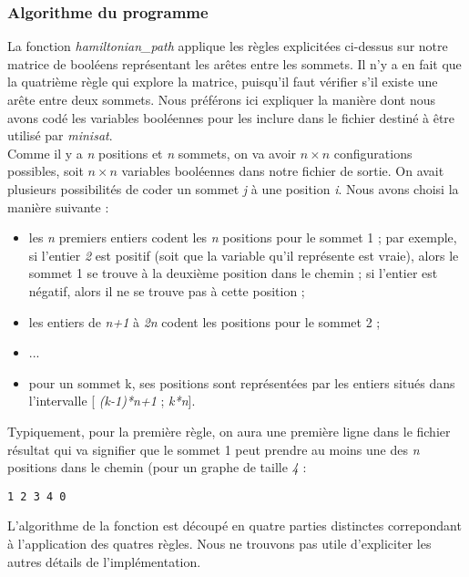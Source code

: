 \documentclass{article}
\begin{document}
\subsubsection{Algorithme du programme}

La fonction \textit{hamiltonian\_path} applique les r\`egles explicit\'ees ci-dessus sur notre matrice de bool\'eens
repr\'esentant les ar\^etes entre les sommets. Il n'y a en fait que la quatri\`eme r\`egle qui explore la matrice,
puisqu'il faut v\'erifier s'il existe une ar\^ete entre deux sommets. Nous pr\'ef\'erons ici expliquer la mani\`ere
dont nous avons cod\'e les variables bool\'eennes pour les inclure dans le fichier destin\'e \`a \^etre utilis\'e
par \textit{minisat}.\\

Comme il y a \textit{n} positions et \textit{n} sommets, on va avoir \textit{$n \times n$} configurations possibles, soit
\textit{$n \times n$} variables bool\'eennes dans notre fichier de sortie. On avait plusieurs possibilit\'es de coder
un sommet \textit{j} \`a une position \textit{i}. Nous avons choisi la mani\`ere suivante :
\begin{itemize}
 \item  les \textit{n} premiers entiers codent les \textit{n} positions pour le sommet 1 ; par exemple, si l'entier \textit{2}
est positif (soit que la variable qu'il repr\'esente est vraie), alors le sommet 1 se trouve \`a la deuxi\`eme position dans
le chemin ; si l'entier est n\'egatif, alors il ne se trouve pas \`a cette position ;
 \item  les entiers de \textit{n+1} \`a \textit{2n} codent les positions pour le sommet 2 ;
 \item ...
 \item pour un sommet k, ses positions sont repr\'esent\'ees par les entiers situ\'es dans l'intervalle [
\textit{(k-1)*n+1} ; \textit{k*n}]. 
\end{itemize}

Typiquement, pour la premi\`ere r\`egle, on aura une premi\`ere ligne dans le fichier r\'esultat qui va signifier
que le sommet 1 peut prendre au moins une des \textit{n} positions dans le chemin (pour un graphe de taille \textit{4} :
\begin{verbatim}
1 2 3 4 0
\end{verbatim}

L'algorithme de la fonction est d\'ecoup\'e en quatre parties distinctes correpondant \`a l'application des quatres r\`egles.
Nous ne trouvons pas utile d'expliciter les autres d\'etails de l'impl\'ementation.
\end{document}
